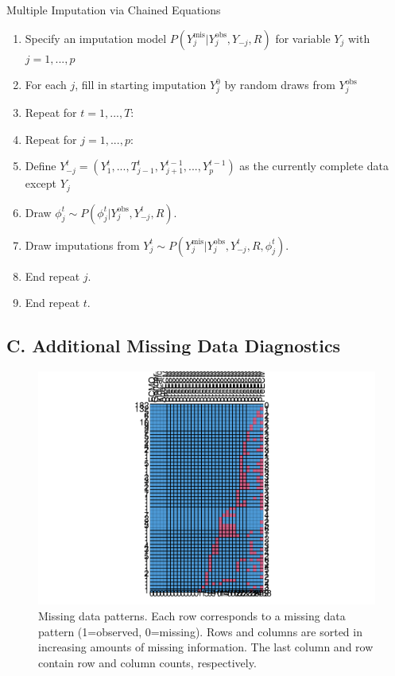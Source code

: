 \documentclass[12pt,]{article}
\begin{document}
\begin{algorithm}[H]

\caption{Multiple Imputation via Chained Equations}
\DontPrintSemicolon
\SetAlgoLined
\BlankLine

\begin{enumerate}
  \item Specify an imputation model $P(Y^{\text{mis}}_j \vert Y^{\text{obs}}_j, Y_{-j}, R)$ for variable $Y_j$ with $j=1,...,p$
  \item For each $j$, fill in starting imputation $Y^0_j$ by random draws from $Y^{\text{obs}}_j$
  \item Repeat for $t=1,...,T:$
  \item Repeat for $j=1,...,p:$
  \item Define $Y^t_{-j} = (Y^t_1,...,T^t_{j-1}, Y^{t-1}_{j+1},..., Y^{t-1}_p)$ as the currently complete data except $Y_j$ 
  \item Draw $\phi^t_j \sim P(\phi^t_j \vert Y^{\text{obs}}_j, Y^t_{-j}, R)$.
  \item Draw imputations from $Y^t_j \sim P(Y^{ \text{mis} }_j \vert Y^{ \text{obs} }_j, Y^t_{-j}, R, \phi^t_j)$.
  \item End repeat $j$.
  \item End repeat $t$.

\end{enumerate}
\BlankLine

\end{algorithm}

\subsection{C. Additional Missing Data
Diagnostics}\label{c.-additional-missing-data-diagnostics}

\begin{figure}[H]

{\centering \includegraphics[width=1\linewidth]{figure/graphics-unnamed-chunk-7-1} 

}

\caption{\label{fig.missing-data-patterns}Missing data patterns.  Each row corresponds to a missing data pattern (1=observed, 0=missing).  Rows and columns are sorted in increasing amounts of missing information.  The last column and row contain row and column counts, respectively.}\label{fig:unnamed-chunk-7}
\end{figure}
\end{document}
